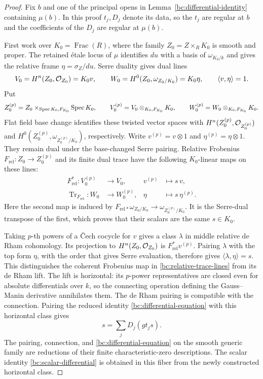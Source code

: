 \begin{proof}
Fix $b$ and one of the principal opens in
Lemma~\ref{bc:differential-identity} containing $\mu(b)$.  In this proof
$t_j,D_j$ denote its data, so the $t_j$ are regular at $b$ and the
coefficients of the $D_j$ are regular at $\mu(b)$.

First work over $K_0=\operatorname{Frac}(R)$, where the family
$Z_0=Z\times_RK_0$ is smooth and proper.  The retained \'{e}tale locus
of $\mu$ identifies $du$ with a basis of $\omega_{K_0/k}$ and gives
the relative frame $\eta=\sigma_Z/du$.  Serre duality gives dual lines
\[
 V_0=H^n(Z_0,\mathcal O_{Z_0})=K_0v,\qquad
 W_0=H^0(Z_0,\omega_{Z_0/K_0})=K_0\eta,\qquad
 \langle v,\eta\rangle=1.
\]
Put
\[
 Z_0^{(p)}=Z_0\times_{\operatorname{Spec} K_0,F_{K_0}}\operatorname{Spec} K_0,\qquad
 V_0^{(p)}=V_0\otimes_{K_0,F_{K_0}}K_0,\qquad
 W_0^{(p)}=W_0\otimes_{K_0,F_{K_0}}K_0.
\]
Flat field base change identifies these twisted vector spaces with
$H^n(Z_0^{(p)},\mathcal O_{Z_0^{(p)}})$ and
$H^0(Z_0^{(p)},\omega_{Z_0^{(p)}/K_0})$, respectively.
Write $v^{(p)}=v\otimes1$ and $\eta^{(p)}=\eta\otimes1$.
They remain dual under the base-changed Serre pairing.
Relative Frobenius $F_{\mathrm{rel}}:Z_0\to Z_0^{(p)}$ and its
finite dual trace have the following $K_0$-linear maps on these lines:
\begin{equation}\label{bc:relative-trace-lines}
 \begin{aligned}
 F_{\mathrm{rel}}^*:V_0^{(p)}&\longrightarrow V_0,
       &v^{(p)}&\longmapsto s\,v,\\
 \operatorname{Tr}_{F_{\mathrm{rel}}}:W_0&\longrightarrow W_0^{(p)},
       &\eta&\longmapsto s\,\eta^{(p)}.
 \end{aligned}
\end{equation}
Here the second map is induced by
$F_{\mathrm{rel}*}\omega_{Z_0/K_0}\to\omega_{Z_0^{(p)}/K_0}$.
It is the Serre-dual transpose of the first, which proves that their
scalars are the same $s\in K_0$.

Taking $p$-th powers of a \v{C}ech cocycle for $v$ gives a class
$\lambda$ in middle relative de Rham cohomology.  Its projection to
$H^n(Z_0,\mathcal O_{Z_0})$ is $F_{\mathrm{rel}}^*v^{(p)}$.  Pairing
$\lambda$ with the top form $\eta$, with the order that gives Serre
evaluation, therefore gives
$\langle\lambda,\eta\rangle=s$.  This distinguishes the coherent
Frobenius map in \eqref{bc:relative-trace-lines} from its de Rham lift.
The lift is horizontal: its $p$-power representatives are closed even
for absolute differentials over $k$, so the connecting operation defining
the Gauss--Manin derivative annihilates them.  The de Rham pairing is
compatible with the connection.  Pairing the reduced identity
\eqref{bc:differential-equation} with this horizontal class gives
\begin{equation}\label{bc:scalar-differential}
                           s=\sum_jD_j(gt_js).
\end{equation}
The pairing, connection, and \eqref{bc:differential-equation} on the
smooth generic family are reductions of their finite characteristic-zero
descriptions.  The scalar identity \eqref{bc:scalar-differential} is
obtained in this fiber from the newly constructed horizontal class.


\end{proof}
